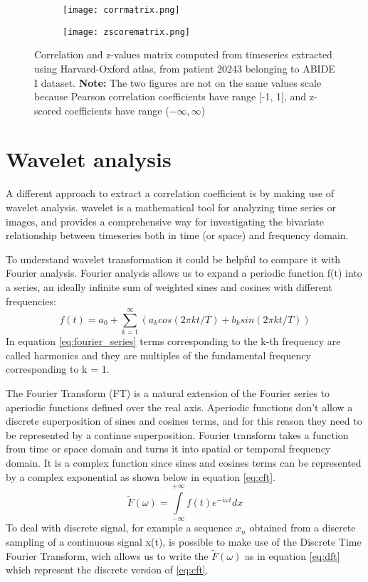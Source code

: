 \documentclass[11pt]{report}
\begin{document}
\begin{figure}
\begin{subfigure}{0.5\textwidth}
\texttt{[image: corrmatrix.png]}
\caption{}
\label{ref:corrmatrix}
\end{subfigure}
\begin{subfigure}{0.5\textwidth}
\texttt{[image: zscorematrix.png]}
\end{subfigure}
\caption{Correlation and z-values matrix computed from timeseries extracted using Harvard-Oxford atlas, from patient 20243 belonging to ABIDE I dataset. \textbf{Note:} The two figures are not on the same values scale because Pearson correlation coefficients have range [-1, 1], and z-scored coefficients have range ($-\infty,\infty$)}
\label{fig:corrmatrices}
\end{figure}

\section{Wavelet analysis}
A different approach to extract a correlation coefficient is by making use of wavelet analysis.\cite{ferrante-2015} \cite{vandenberg-1999}
wavelet is a mathematical tool for analyzing time series or images, and provides a comprehensive way for investigating the bivariate relationship between timeseries both in time (or space) and frequency domain.

To understand wavelet transformation it could be helpful to compare it with Fourier analysis.
Fourier analysis allows us to expand a periodic function f(t) into a series, an ideally infinite sum of weighted sines and cosines with different frequencies:
\begin{equation}\label{eq:fourier_series}
f(t) = a_0 + \sum_{k = 1}^\infty (a_k cos(2\pi k t/T) + b_k sin (2\pi k t /T))
\end{equation}
In equation \ref{eq:fourier_series} terms corresponding to the k-th frequency are called harmonics and they are multiples of the fundamental frequency corresponding to k = 1.

The Fourier Transform (FT) is a natural extension of the Fourier series to aperiodic functions defined over the real axis.
Aperiodic functions don't allow a discrete superposition of sines and cosines terms, and for this reason they need to be represented by a continue superposition.
Fourier transform takes a function from time or space domain and turns it into spatial or temporal frequency domain.
It is a complex function since sines and cosines terms can be represented by a complex exponential as shown below in equation \ref{eq:cft}.
\begin{equation}\label{eq:cft}
\tilde{F}(\omega) = \int\limits_{-\infty}^{+\infty} f(t)e^{-i \omega t} dx
\end{equation}
To deal with discrete signal, for example a sequence $x_n$ obtained from a discrete sampling of a continuous signal x(t), is possible to make use of the Discrete Time Fourier Transform, wich allows us to write the $\tilde F(\omega)$ as in equation \ref{eq:dft} which represent the discrete version of \ref{eq:cft}.
\end{document}
